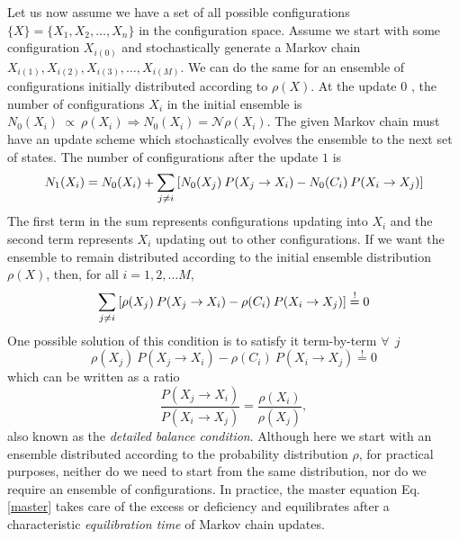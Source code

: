 \documentclass[../thesis_main.tex]{subfiles}
\begin{document}
Let us now assume we have a set of all possible configurations $\{X\} = \{X_1, X_2, \ldots, X_n\}$ in the configuration space. Assume we start with some configuration $X_{i(0)}$ and stochastically generate a Markov chain $X_{i(1)}, X_{i(2)}, X_{i(3)}, \ldots, X_{i(M)}$. We can do the same for an ensemble of configurations initially distributed according to $\rho(X)$. At the update $0$ , the number of configurations $X_i$ in the initial ensemble is $N_0(X_i) \: \propto \: \rho(X_i) \Rightarrow N_0 (X_i) = \mathcal{N} \rho(X_i)$. The given Markov chain must have an update scheme which stochastically evolves the ensemble to the next set of states. The number of configurations after the update $1$ is
\begin{equation}
    N_1(X_i) = N_0(X_i) + \sum_{j\neq i} \qty[N_0(X_j) \: P(X_j \to X_i) - N_0(C_i) \: P(X_i \to X_j)]
    \label{master}
\end{equation}
The first term in the sum represents configurations updating into $X_i$ and the second term represents $X_i$ updating out to other configurations. If we want the ensemble to remain distributed according to the initial ensemble distribution $\rho(X)$, then, for all $i = 1, 2, \ldots M$,
\begin{equation}
    \sum_{j\neq i} \qty[\rho(X_j) \: P(X_j \to X_i) - \rho(C_i) \: P(X_i \to X_j)] \stackrel{!}{=} 0
\end{equation}  
One possible solution of this condition is to satisfy it term-by-term $\forall \: \: j$ 
\begin{equation}
    \rho(X_j) \: P(X_j \to X_i) - \rho(C_i) \: P(X_i \to X_j) \stackrel{!}{=} 0
\end{equation}
which can be written as a ratio 
\begin{equation}
    \frac{P(X_j \to X_i)}{P(X_i \to X_j)} = \frac{\rho(X_i)}{\rho(X_j)},
    \label{detailedbalance}
\end{equation}
also known as the \textit{detailed balance condition}. Although here we start with an ensemble distributed according to the probability distribution $\rho$, for practical purposes, neither do we need to start from the same distribution, nor do we require an ensemble of configurations. In practice, the master equation Eq. \eqref{master} takes care of the excess or deficiency and equilibrates after a characteristic \textit{equilibration time} of Markov chain updates.
\end{document}
